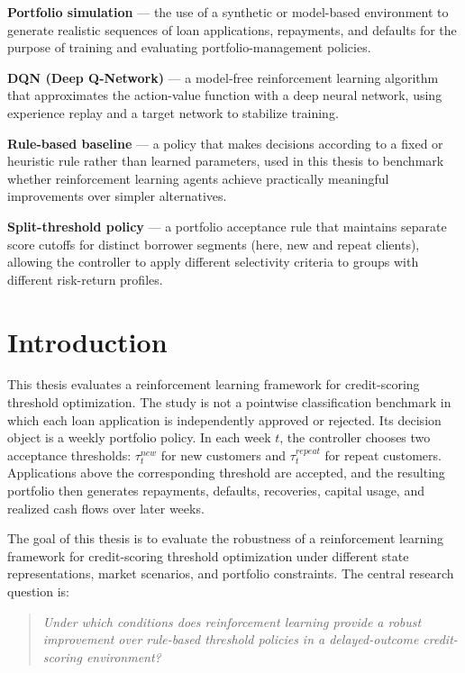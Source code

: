 \documentclass[12pt,a4paper]{article}
\begin{document}
\medskip\noindent\textbf{Portfolio simulation} --- the use of a synthetic or model-based environment to generate realistic sequences of loan applications, repayments, and defaults for the purpose of training and evaluating portfolio-management policies.

\medskip\noindent\textbf{DQN (Deep Q-Network)} --- a model-free reinforcement learning algorithm that approximates the action-value function with a deep neural network, using experience replay and a target network to stabilize training.

\medskip\noindent\textbf{Rule-based baseline} --- a policy that makes decisions according to a fixed or heuristic rule rather than learned parameters, used in this thesis to benchmark whether reinforcement learning agents achieve practically meaningful improvements over simpler alternatives.

\medskip\noindent\textbf{Split-threshold policy} --- a portfolio acceptance rule that maintains separate score cutoffs for distinct borrower segments (here, new and repeat clients), allowing the controller to apply different selectivity criteria to groups with different risk-return profiles.

\clearpage
\tableofcontents
\clearpage

\section{Introduction}

This thesis evaluates a reinforcement learning framework for credit-scoring threshold optimization. The study is not a pointwise classification benchmark in which each loan application is independently approved or rejected. Its decision object is a weekly portfolio policy. In each week $t$, the controller chooses two acceptance thresholds: $\tau^{new}_t$ for new customers and $\tau^{repeat}_t$ for repeat customers. Applications above the corresponding threshold are accepted, and the resulting portfolio then generates repayments, defaults, recoveries, capital usage, and realized cash flows over later weeks.

The goal of this thesis is to evaluate the robustness of a reinforcement learning framework for credit-scoring threshold optimization under different state representations, market scenarios, and portfolio constraints. The central research question is:
\begin{quote}
    \emph{Under which conditions does reinforcement learning provide a robust improvement over rule-based threshold policies in a delayed-outcome credit-scoring environment?}
\end{quote}
\end{document}
